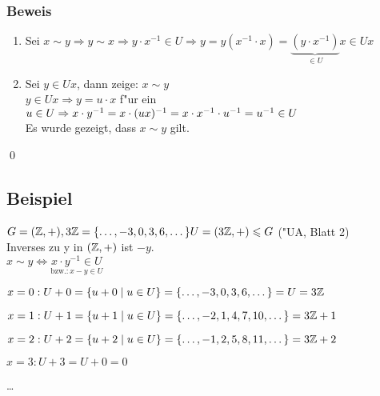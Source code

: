 {\begin{enumerate}
		\subsubsection*{Beweis}
		\begin{enumerate}
			\item
			Sei $x \sim y \Rightarrow y \sim x \Rightarrow y \cdot x^{-1} \in U \Rightarrow y=y(x^{-1} \cdot x) = \underbrace{(y \cdot x^{-1})}_{\in U}x \in Ux$
			\item
			Sei $y \in Ux$, dann zeige: $x \sim y$ \\
			$y \in Ux \Rightarrow y = u \cdot x$ f"ur ein $u \in U\\
			\Rightarrow x \cdot y^{-1} = x \cdot (ux)^{-1} = x \cdot x^{-1} \cdot u^{-1} = u^{-1} \in U$\\
			Es wurde gezeigt, dass $x \sim y$ gilt.
		\end{enumerate} \qed

\end{enumerate}}

\subsection{Beispiel}

$G = (\mathbb{Z}, +), 3 \mathbb{Z} = \{\dots, -3,0,3,6,\dots\}\\
U = (3 \mathbb{Z}, +) \leqslant G$ ("UA, Blatt 2)\\
Inverses zu y in $(\mathbb{Z},+)$ ist $-y$.\\
$x \sim y \Leftrightarrow \underset{\text{bzw.:}\, x-y \in U}{x \cdot y ^{-1} \in U}$ 


$ x=0 : U+0 = \{u+0 \;|\; u \in U\}= \{\dots, -3,0,3,6,\dots\} = U = 3\mathbb{Z}$
   
$x=1 : U+1 = \{u+1 \;|\; u \in U\} = \{\dots, -2, 1, 4, 7, 10, \dots \} = 3\mathbb{Z} +1$

$x=2 : U+2 = \left\{u + 2 \;|\; u \in U\right\} = \left\{\dots, -1, 2, 5, 8, 11, \dots\right\} = 3 \mathbb{Z} + 2$

$x=3: U+3 = U+0 = 0$

\dots
   
   
   
   
   
   
   
   
   
   
   
   
   
   
   
   
   